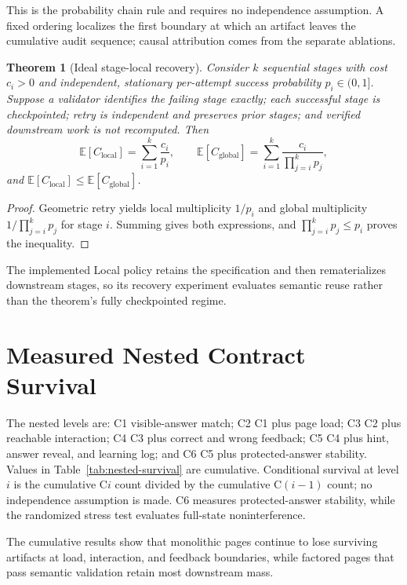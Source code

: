 \documentclass[letterpaper]{article}
\newtheorem{theorem}{Theorem}
\begin{document}
This is the probability chain rule and requires no independence assumption. A fixed ordering localizes the first boundary at which an artifact leaves the cumulative audit sequence; causal attribution comes from the separate ablations.

\begin{theorem}[Ideal stage-local recovery]
Consider $k$ sequential stages with cost $c_i>0$ and independent, stationary per-attempt success probability $p_i\in(0,1]$. Suppose a validator identifies the failing stage exactly; each successful stage is checkpointed; retry is independent and preserves prior stages; and verified downstream work is not recomputed. Then
\[
\mathbb{E}[C_{\mathrm{local}}]=\sum_{i=1}^{k}\frac{c_i}{p_i},
\qquad
\mathbb{E}[C_{\mathrm{global}}]
=\sum_{i=1}^{k}\frac{c_i}{\prod_{j=i}^{k}p_j},
\]
and $\mathbb{E}[C_{\mathrm{local}}]\leq
\mathbb{E}[C_{\mathrm{global}}]$.
\end{theorem}

\begin{proof}
Geometric retry yields local multiplicity $1/p_i$ and global multiplicity $1/\prod_{j=i}^{k}p_j$ for stage $i$. Summing gives both expressions, and $\prod_{j=i}^{k}p_j\leq p_i$ proves the inequality.
\end{proof}

The implemented Local policy retains the specification and then rematerializes downstream stages, so its recovery experiment evaluates semantic reuse rather than the theorem's fully checkpointed regime.

\section{Measured Nested Contract Survival}

The nested levels are: C1 visible-answer match; C2 C1 plus page load; C3 C2 plus reachable interaction; C4 C3 plus correct and wrong feedback; C5 C4 plus hint, answer reveal, and learning log; and C6 C5 plus protected-answer stability. Values in Table~\ref{tab:nested-survival} are cumulative. Conditional survival at level $i$ is the cumulative C$i$ count divided by the cumulative C$(i-1)$ count; no independence assumption is made. C6 measures protected-answer stability, while the randomized stress test evaluates full-state noninterference.

The cumulative results show that monolithic pages continue to lose surviving artifacts at load, interaction, and feedback boundaries, while factored pages that pass semantic validation retain most downstream mass.
\end{document}

